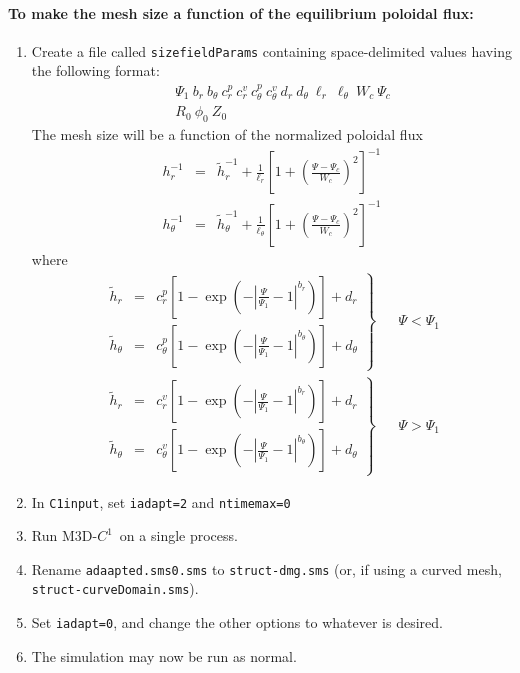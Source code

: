 \documentclass[letterpaper]{book}
\newcommand{\codename}{\textsc{M3D-$C^1$}}
\begin{document}
\paragraph{To make the mesh size a function of the equilibrium poloidal flux:}
\begin{enumerate}
\item Create a file called \texttt{sizefieldParams} containing
  space-delimited values having the following format:
  \begin{eqnarray*}
    & & \Psi_1\ b_r\ b_\theta\ c_r^p\ c_r^v\ c_\theta^p\ c_\theta^v\ 
    d_r\ d_\theta\ \ell_r\ \ell_\theta\ W_c\ \Psi_c\\
    & & R_0\ \phi_0\ Z_0
  \end{eqnarray*}
  The mesh size will be a function of the normalized poloidal flux
  \begin{eqnarray*}
      h_r^{-1} & = & \tilde{h}_r^{-1} 
      + \frac{1}{\ell_r} 
      \left[1 + \left( \frac{\Psi - \Psi_c}{W_c} \right)^2 \right]^{-1}
      \\
      h_\theta^{-1} & = & \tilde{h}_\theta^{-1} 
      + \frac{1}{\ell_\theta} 
      \left[1 + \left( \frac{\Psi - \Psi_c}{W_c} \right)^2 \right]^{-1}
  \end{eqnarray*}
  where
  \begin{eqnarray*}
    \left.
    \begin{array}{rcl}
      \tilde{h}_r & = & 
      c_r^p \left[1 - 
        \exp\left(-\left|\frac{\Psi}{\Psi_1}-1\right|^{b_r}\right)\right]
      + d_r
      \\
      \tilde{h}_\theta & = & 
      c_\theta^p \left[1 - 
        \exp\left(-\left|\frac{\Psi}{\Psi_1}-1\right|^{b_\theta}\right)\right]
      + d_\theta
      \end{array}
    \right\} & & \Psi < \Psi_1
    \\
    \left.
    \begin{array}{rcl}
      \tilde{h}_r & = & 
      c_r^v \left[1 - 
        \exp\left(-\left|\frac{\Psi}{\Psi_1}-1\right|^{b_r}\right)\right]
      + d_r
      \\
      \tilde{h}_\theta & = & 
      c_\theta^v \left[1 - 
        \exp\left(-\left|\frac{\Psi}{\Psi_1}-1\right|^{b_\theta}\right)\right]
      + d_\theta
      \end{array}
    \right\} & & \Psi > \Psi_1
  \end{eqnarray*}
\item In \texttt{C1input}, set \texttt{iadapt=2} and \texttt{ntimemax=0}
\item Run \codename\ on a single process.
\item Rename \texttt{adaapted.sms0.sms} to \texttt{struct-dmg.sms}
  (or, if using a curved mesh, \texttt{struct-curveDomain.sms}).
\item Set \texttt{iadapt=0}, and change the other options to whatever
  is desired.
\item The simulation may now be run as normal.
\end{enumerate}
\end{document}
